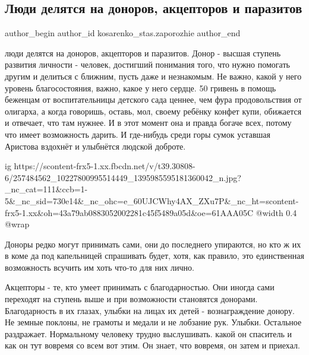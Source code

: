  
 
 
 
 
 
\subsection{Люди делятся на доноров, акцепторов и паразитов}
\label{sec:25_11_2021.fb.kosarenko_stas.zaporozhie.1.ljudi}
 
\ifcmt
 author_begin
   author_id kosarenko_stas.zaporozhie
 author_end
\fi

люди делятся на доноров, акцепторов и паразитов. Донор - высшая ступень
развития личности - человек, достигший понимания того, что нужно помогать
другим и делиться с ближним, пусть даже и незнакомым. Не важно, какой у него
уровень благосостояния, важно, какое у него сердце. 50 гривень в помощь
беженцам от воспитательницы детского сада ценнее, чем фура продовольствия от
олигарха, а когда говоришь, оставь, мол, своему ребёнку конфет купи, обижается
и отвечает, что там нужнее. И в этот момент она и правда богаче всех, потому
что имеет возможность дарить. И где-нибудь среди горы сумок уставшая Аристова
вздохнёт и улыбнётся людской доброте.

\ifcmt
  ig https://scontent-frx5-1.xx.fbcdn.net/v/t39.30808-6/257484562_10227800995514449_1395985595181360042_n.jpg?_nc_cat=111&ccb=1-5&_nc_sid=730e14&_nc_ohc=e_60UJCWhy4AX_ZXu7P&_nc_ht=scontent-frx5-1.xx&oh=43a79ab0883052002281c45f5489a05d&oe=61AAA05C
  @width 0.4
  @wrap 
\fi

Доноры редко могут принимать сами, они до последнего упираются, но кто ж их в
коме да под капельницей спрашивать будет, хотя, как правило, это единственная
возможность всучить им хоть что-то для них лично.

Акцепторы - те, кто умеет принимать с благодарностью. Они иногда сами переходят
на ступень выше и при возможности становятся донорами. Благодарность в их
глазах, улыбки на лицах их детей - вознаграждение донору. Не земные поклоны, не
грамоты и медали и не лобзание рук. Улыбки. Остальное раздражает. Нормальному
человеку трудно выслушивать. какой он спаситель и как он тут вовремя со всем
вот этим. Он знает, что вовремя, он затем и приехал.

